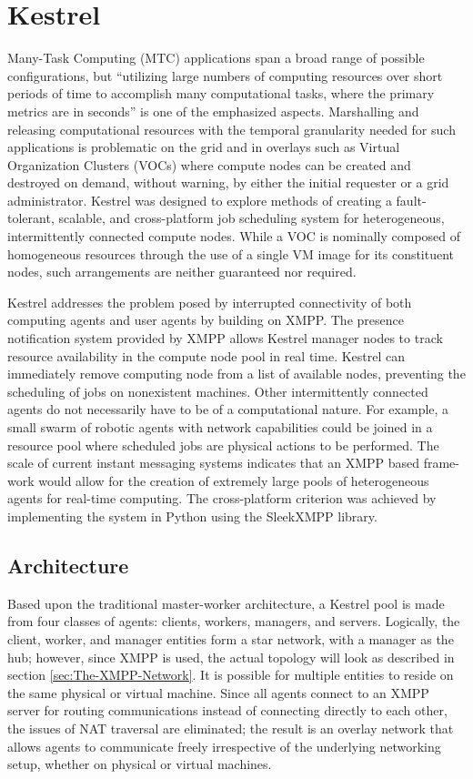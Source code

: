 \chapter{Kestrel}
\label{chap:Kestrel} 

Many-Task Computing (MTC) applications span a broad range of possible
configurations, but ``utilizing large numbers of computing resources over short
periods of time to accomplish many computational tasks, where the primary
metrics are in seconds'' \cite{Raicu2008} is one of the emphasized aspects.
Marshalling and releasing computational resources with the temporal granularity
needed for such applications is problematic on the grid and in overlays such
as Virtual Organization Clusters (VOCs) where compute nodes can be created
and destroyed on demand, without warning, by either the initial requester or
a grid administrator. Kestrel was designed to explore methods of creating
a fault-tolerant, scalable, and cross-platform job scheduling system for
heterogeneous, intermittently connected compute nodes. While a VOC is nominally
composed of homogeneous resources through the use of a single VM image for its
constituent nodes, such arrangements are neither guaranteed nor required.

Kestrel addresses the problem posed by interrupted connectivity of both
computing agents and user agents by building on XMPP. The presence notification
system provided by XMPP allows Kestrel manager nodes to track resource
availability in the compute node pool in real time. Kestrel can immediately
remove computing node from a list of available nodes, preventing the scheduling
of jobs on nonexistent machines. Other intermittently connected agents do not
necessarily have to be of a computational nature. For example, a small swarm
of robotic agents with network capabilities could be joined in a resource pool
where scheduled jobs are physical actions to be performed. The scale of current
instant messaging systems indicates that an XMPP based frame- work would allow
for the creation of extremely large pools of heterogeneous agents for real-time
computing. The cross-platform criterion was achieved by implementing the system
in Python using the SleekXMPP \cite{SleekXMPP} library.

\section{Architecture}
Based upon the traditional master-worker architecture, a Kestrel pool is made
from four classes of agents: clients, workers, managers, and servers. Logically,
the client, worker, and manager entities form a star network, with a manager as
the hub; however, since XMPP is used, the actual topology will look as described
in section \ref{sec:The-XMPP-Network}. It is possible for multiple entities to
reside on the same physical or virtual machine. Since all agents connect to an
XMPP server for routing communications instead of connecting directly to each
other, the issues of NAT traversal are eliminated; the result is an overlay
network that allows agents to communicate freely irrespective of the underlying
networking setup, whether on physical or virtual machines.

